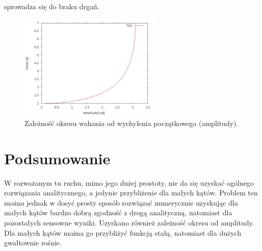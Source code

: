 \documentclass[11pt]{article}
\begin{document}
sprowadza się do braku drgań.
\begin{figure}[h!]
\centering
\includegraphics[width=0.6\textwidth]{okres.jpg}
\caption{Zależność okresu wahania od wychylenia początkowego (amplitudy).}
\label{T}
\end{figure}

\section*{Podsumowanie}
W rozważanym tu ruchu, mimo jego dużej prostoty, nie da się uzyskać ogólnego rozwiązania analitycznego, a jedynie przybliżenie dla małych kątów.
Problem ten można jednak w dosyć prosty sposób rozwiązać numerycznie uzyskując dla małych kątów bardzo dobrą zgodność z drogą analityczną, natomiast 
dla pozostałych sensowne wyniki. Uzyskano również zależność okresu od amplitudy. Dla małych kątów można go przybliżyć funkcją stałą, natomiast dla dużych gwałtownie rośnie.
\end{document}
